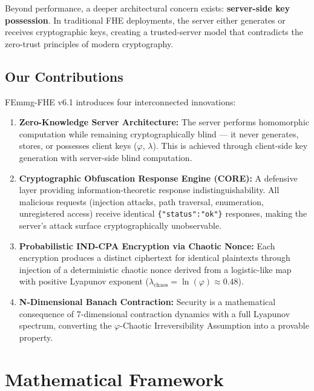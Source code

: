 \documentclass{article}
\begin{document}
Beyond performance, a deeper architectural concern exists: \textbf{server-side key possession}. In traditional FHE deployments, the server either generates or receives cryptographic keys, creating a trusted-server model that contradicts the zero-trust principles of modern cryptography.

\subsection{Our Contributions}

FEmmg-FHE v6.1 introduces four interconnected innovations:

\begin{enumerate}
    \item \textbf{Zero-Knowledge Server Architecture:} The server performs homomorphic computation while remaining cryptographically blind — it never generates, stores, or possesses client keys ($\varphi$, $\lambda$). This is achieved through client-side key generation with server-side blind computation.
    
    \item \textbf{Cryptographic Obfuscation Response Engine (CORE):} A defensive layer providing information-theoretic response indistinguishability. All malicious requests (injection attacks, path traversal, enumeration, unregistered access) receive identical \texttt{\{"status":"ok"\}} responses, making the server's attack surface cryptographically unobservable.
    
    \item \textbf{Probabilistic IND-CPA Encryption via Chaotic Nonce:} Each encryption produces a distinct ciphertext for identical plaintexts through injection of a deterministic chaotic nonce derived from a logistic-like map with positive Lyapunov exponent ($\lambda_{\text{chaos}} = \ln(\varphi) \approx 0.48$).
    
    \item \textbf{N-Dimensional Banach Contraction:} Security is a mathematical consequence of 7-dimensional contraction dynamics with a full Lyapunov spectrum, converting the $\varphi$-Chaotic Irreversibility Assumption into a provable property.
\end{enumerate}

\section{Mathematical Framework}
\end{document}
